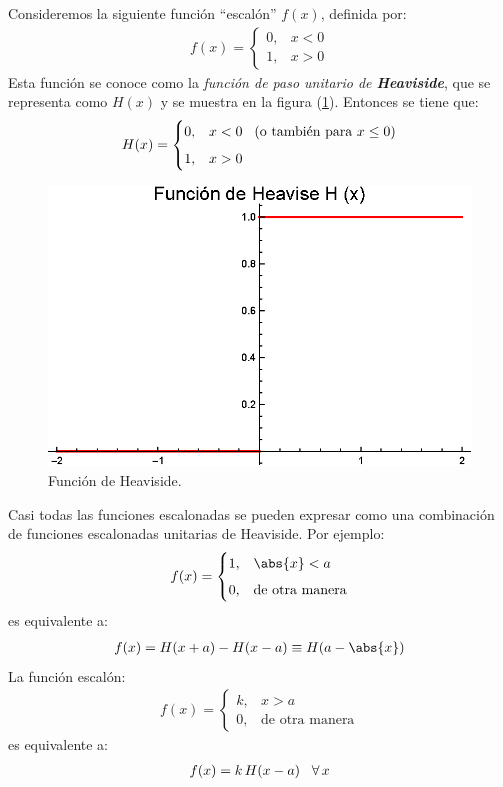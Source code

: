 Consideremos la siguiente función \enquote{escalón} $f (x)$, definida por:
\begin{align*}
f (x) = \begin{cases}
0, & x < 0 \\[0.5em]
1, & x > 0
\end{cases}
\end{align*}
Esta función se conoce como la \emph{función de paso unitario de \textbf{Heaviside}}, que se representa como $H (x)$ y se muestra en la figura (\ref{fig:figura_plot_Heaviside}). Entonces se tiene que:
\begin{align*}
H (x) = \begin{cases}
0, & x < 0 \hspace{0.3cm} (\mbox{o también para } x \leq 0 ) \\[0.5em]
1, & x > 0
\end{cases}
\end{align*}
\begin{figure}[H]
    \centering
    \includegraphics[scale=1]{Imagenes/Plot_Heaviside.eps}
    \caption{Función de Heaviside.}
    \label{fig:figura_plot_Heaviside}
\end{figure}
Casi todas las funciones escalonadas se pueden expresar como una combinación de funciones escalonadas unitarias de Heaviside. Por ejemplo:
\begin{align*}
f (x) = \begin{cases}
1, & \abs{x} < a \\[0.5em]
0, & \mbox{de otra manera}
\end{cases}
\end{align*}
es equivalente a:
\begin{align*}
f (x) = H (x + a) - H (x- a) \equiv H (a - \abs{x})
\end{align*}
La función escalón:
\begin{align*}
f (x) = \begin{cases}
k, & x > a \\[0.5em]
0, & \mbox{de otra manera}
\end{cases}
\end{align*}
es equivalente a:
\begin{align*}
f (x) = k \, H (x - a) \hspace{0.3cm} \forall \, x
\end{align*}
\bigskip

